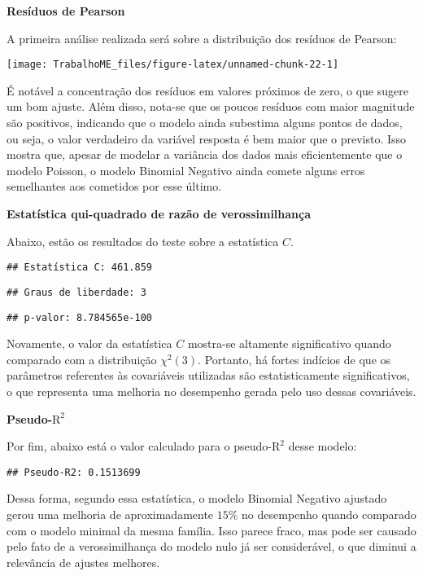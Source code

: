 \documentclass[
  twocolumn]{article}
\begin{document}
\textbf{Resíduos de Pearson}

A primeira análise realizada será sobre a distribuição dos resíduos de
Pearson:

\begin{center}\texttt{[image: TrabalhoME\_files/figure-latex/unnamed-chunk-22-1]} \end{center}

É notável a concentração dos resíduos em valores próximos de zero, o que
sugere um bom ajuste. Além disso, nota-se que os poucos resíduos com
maior magnitude são positivos, indicando que o modelo ainda subestima
alguns pontos de dados, ou seja, o valor verdadeiro da variável resposta
é bem maior que o previsto. Isso mostra que, apesar de modelar a
variância dos dados mais eficientemente que o modelo Poisson, o modelo
Binomial Negativo ainda comete alguns erros semelhantes aos cometidos
por esse último.

\vspace{2cm}

\textbf{Estatística qui-quadrado de razão de verossimilhança}

Abaixo, estão os resultados do teste sobre a estatística \(C\).

\begin{verbatim}
## Estatística C: 461.859
\end{verbatim}

\begin{verbatim}
## Graus de liberdade: 3
\end{verbatim}

\begin{verbatim}
## p-valor: 8.784565e-100
\end{verbatim}

Novamente, o valor da estatística \(C\) mostra-se altamente
significativo quando comparado com a distribuição \(\chi^2(3)\).
Portanto, há fortes indícios de que os parâmetros referentes às
covariáveis utilizadas são estatisticamente significativos, o que
representa uma melhoria no desempenho gerada pelo uso dessas
covariáveis.

\textbf{Pseudo-\(\text{R}^2\)}

Por fim, abaixo está o valor calculado para o pseudo-\(\text{R}^2\)
desse modelo:

\begin{verbatim}
## Pseudo-R2: 0.1513699
\end{verbatim}

Dessa forma, segundo essa estatística, o modelo Binomial Negativo
ajustado gerou uma melhoria de aproximadamente \(15\%\) no desempenho
quando comparado com o modelo minimal da mesma família. Isso parece
fraco, mas pode ser causado pelo fato de a verossimilhança do modelo
nulo já ser considerável, o que diminui a relevância de ajustes
melhores.
\end{document}
